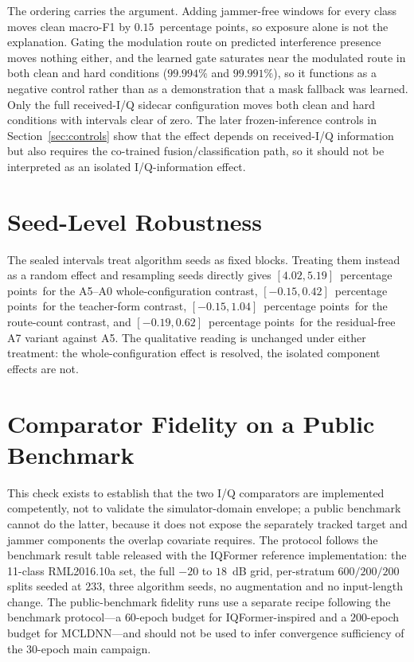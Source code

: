 \documentclass[letterpaper,onecolumn,11pt,journal]{IEEEtran}
\newcommand{\pp}{percentage points}
\begin{document}
The ordering carries the argument. Adding jammer-free windows for every class
moves clean macro-F1 by $0.15$~\pp, so exposure alone is not the explanation.
Gating the modulation route on predicted interference presence moves nothing
either, and the learned gate saturates near the modulated route in both clean
and hard conditions ($99.994\%$ and $99.991\%$), so it functions as a negative
control rather than as a demonstration that a mask fallback was learned. Only
the full received-I/Q sidecar configuration moves both clean and hard
conditions with intervals clear of zero. The later frozen-inference controls
in Section~\ref{sec:controls} show that the effect depends on received-I/Q
information but also requires the co-trained fusion/classification path, so it
should not be interpreted as an isolated I/Q-information effect.

\section{Seed-Level Robustness}
The sealed intervals treat algorithm seeds as fixed blocks. Treating them
instead as a random effect and resampling seeds directly gives
$[4.02,5.19]$~\pp\ for the A5--A0 whole-configuration contrast,
$[-0.15,0.42]$~\pp\ for the teacher-form contrast, $[-0.15,1.04]$~\pp\ for the
route-count contrast, and $[-0.19,0.62]$~\pp\ for the residual-free A7 variant
against A5. The qualitative reading is unchanged under either treatment: the
whole-configuration effect is resolved, the isolated component effects are not.

\section{Comparator Fidelity on a Public Benchmark}
This check exists to establish that the two I/Q comparators are implemented
competently, not to validate the simulator-domain envelope; a public benchmark
cannot do the latter, because it does not expose the separately tracked target
and jammer components the overlap covariate requires. The protocol follows the
benchmark result table released with the IQFormer reference implementation:
the 11-class RML2016.10a set, the full $-20$ to $18$~dB grid, per-stratum
$600/200/200$ splits seeded at $233$, three algorithm seeds, no augmentation
and no input-length change. The public-benchmark fidelity runs use a separate
recipe following the benchmark protocol---a $60$-epoch budget for
IQFormer-inspired and a $200$-epoch budget for MCLDNN---and should not be used
to infer convergence sufficiency of the $30$-epoch main campaign.
\end{document}
